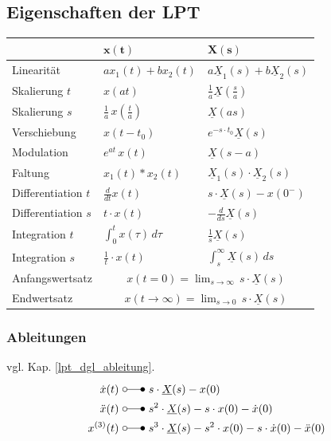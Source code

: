 \subsection{Eigenschaften der LPT}
\renewcommand{\arraystretch}{1.8}
\begin{tabularx}{\columnwidth}{|X|X|X|}
	\hline
	& $\mathbf{x(t)}$ & \underline{$\mathbf{X}$}$\mathbf{(s)}$\\
	\hline Linearität & $a x_{1}(t)+b x_{2}(t)$ & $a \underline{X}_{1}(s)+b\underline{X}_{2}(s)$ \\
	\hline Skalierung $t$ & $x(at)$ & $\frac{1}{a} \underline{X}(\frac{s}{a})$ \\
	\hline Skalierung $s$ & $\frac{1}{a} \, x(\frac{t}{a})$ & $\underline{X}(as)$ \\
	\hline Verschiebung	& $x(t-t_0)$ & $e^{-s \cdot t_0} \underline{X}(s)$ \\
	\hline Modulation & $e^{at} \, x(t)$ & $\underline{X} (s-a)$ \\
	\hline Faltung & $x_{1}(t) * x_{2}(t) $ & $ \underline{X}_{1}(s) \cdot \underline{X}_{2}(s)$ \\
	\hline Differentiation $t$ & $ \frac{d}{dt} x(t) $ & $ s\cdot \underline{X}(s)-x(0^-)$ \\
	\hline Differentiation $s$ & $t \cdot x(t) $ & $-\frac{d}{d s} \underline{X}(s)$ \\
	\hline Integration $t$ & $\int_{0}^{t} x(\tau) \, d\tau $ & $ \frac{1}{s} \underline{X}(s)$ \\
	\hline Integration $s$ & $\frac{1}{t} \cdot x(t) $ & $ \int_{s}^{\infty} \underline{X}(s) \, ds$ \\
	\hline Anfangswertsatz & \multicolumn{2}{c|}{$x(t=0) = \lim_{s\to\infty}\, s\cdot \underline{X}(s)$} \\
	\hline Endwertsatz & \multicolumn{2}{c|}{$x(t\rightarrow\infty) = \lim_{s\to 0}\, s\cdot \underline{X}(s)$} \\
	\hline
\end{tabularx}
\subsubsection{Ableitungen}
vgl. Kap. \ref{lpt_dgl_ableitung}.
\begin{align*}
	\dot{x}(t) \ &\laplace\ s\cdot\underline{X}(s)-x(0)\\
	\ddot{x}(t) \ &\laplace\ s^2\cdot\underline{X}(s)-s\cdot x(0)-\dot{x}(0)\\
	x^{(3)}(t) \ &\laplace\ s^3\cdot\underline{X}(s)-s^2\cdot x(0)-s\cdot \dot{x}(0) - \ddot{x}(0)
\end{align*}

